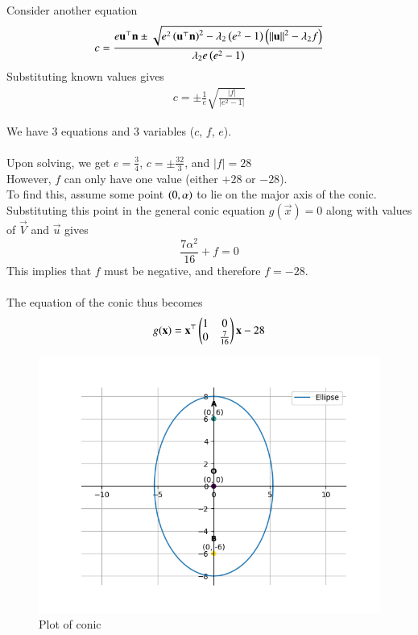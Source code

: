 \documentclass[journal]{IEEEtran}
\begin{document}
Consider another equation $$c=\frac{e\mathbf{u}^\top\mathbf{n}\pm\sqrt{e^2\left(\mathbf{u}^\top\mathbf{n}\right)^2-\lambda_2\left(e^2-1\right)\left(\left\lVert\mathbf{u}\right\rVert^2-\lambda_2f\right)}}{\lambda_2e\left(e^2-1\right)}$$
Substituting known values gives
\begin{align}
c=\pm\frac{1}{e}\sqrt{\frac{|f|}{|e^2-1|}}
\end{align}

We have 3 equations and 3 variables ($c$, $f$, $e$).
\\ \\
Upon solving, we get $e=\frac{3}{4}$, $c=\pm\frac{32}{3}$, and $|f|=28$
\\
However, $f$ can only have one value (either $+28$ or $-28$).
\\
To find this, assume some point $\left(0,\alpha\right)$ to lie on the major axis of the conic. Substituting this point in the general conic equation $g(\vec{x})=0$ along with values of $\vec{V}$ and $\vec{u}$ gives $$\frac{7\alpha^2}{16}+f=0$$
This implies that $f$ must be negative, and therefore $f=-28$.
\\ \\
The equation of the conic thus becomes $$g(\mathbf{x}) = \mathbf{x}^\top\begin{pmatrix}1&0\\0&\frac{7}{16}\end{pmatrix}\mathbf{x}-28$$

\begin{figure}[h]
	\centering
	\includegraphics[width=\columnwidth]{figs/fig.png}
	\caption{Plot of conic}
\end{figure}
\end{document}
